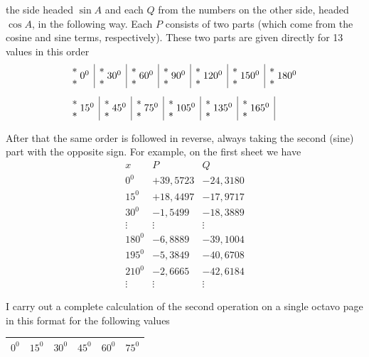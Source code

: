 \begin{landscape}
the side headed \(\sin A\) and each \(Q\) from the numbers on the other side,
headed \(\cos A\), in the following way. Each \(P\) consists of two parts
(which come from the cosine and sine terms, respectively). These
two parts are given directly for 13 values in
this order
\providecommand{\VIIthreeStars}[1]{\begin{array}{@{}c@{}}\ast\\\ast\end{array}\;#1}
\begingroup\small
\[
\begin{aligned}
&\begin{array}{c|c|c|c|c|c|c}
\VIIthreeStars{0^0}&\VIIthreeStars{30^0}&\VIIthreeStars{60^0}&\VIIthreeStars{90^0}&\VIIthreeStars{120^0}&\VIIthreeStars{150^0}&\VIIthreeStars{180^0}
\end{array}\\[1ex]
&\begin{array}{c|c|c|c|c|c|}
\VIIthreeStars{15^0}&\VIIthreeStars{45^0}&\VIIthreeStars{75^0}&\VIIthreeStars{105^0}&\VIIthreeStars{135^0}&\VIIthreeStars{165^0}
\end{array}
\end{aligned}
\]
\endgroup
\par\noindent\hspace*{\parindent}After that the same order is followed in reverse, always taking the second
(sine) part with the opposite sign. For example, on the first sheet we
have
\[
\begin{array}{r|r|r}
x&P&Q\\
0^0&+39{,}5723&-24{,}3180\\
15^0&+18{,}4497&-17{,}9717\\
30^0&-1{,}5499&-18{,}3889\\
\vdots&\vdots&\vdots\\
180^0&-6{,}8889&-39{,}1004\\
195^0&-5{,}3849&-40{,}6708\\
210^0&-2{,}6665&-42{,}6184\\
\vdots&\vdots&\vdots
\end{array}
\]
\par\noindent I carry out a complete calculation of the second operation on a single octavo page
in this format for the following values
\begingroup\renewcommand{\arraystretch}{1.8}\setlength{\tabcolsep}{13pt}
\begin{center}
\begin{tabular}{|c|c|c|c|c|c|}
\hline
\(0^0\)&\(15^0\)&\(30^0\)&\(45^0\)&\(60^0\)&\(75^0\)\\\hline

\end{tabular}
\end{center}
\end{landscape}
